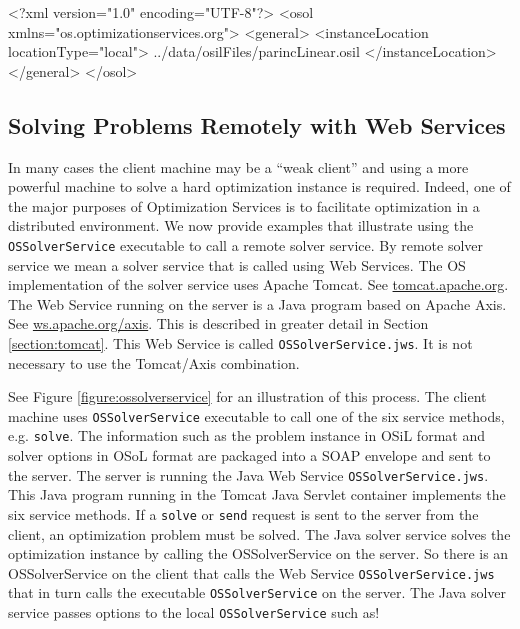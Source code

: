 \documentclass[11pt]{article}
\newcounter{Fig}
\renewcommand{\_}{{\char"5F}}
\renewcommand{\{}{{\char"7B}}
\renewcommand{\}}{{\char"7D}}
\renewcommand{\^}{{\char"0D}}
\renewcommand{\'}{{\char"0D}}
\begin{document}
\begin{verbatimtab}[4]
<?xml version="1.0" encoding="UTF-8"?>
<osol xmlns="os.optimizationservices.org">
	<general>
		<instanceLocation locationType="local">
			../data/osilFiles/parincLinear.osil
		</instanceLocation>
	</general>
</osol>
\end{verbatimtab}

\subsection{Solving Problems Remotely with Web Services}\label{section:servicemethods}

In many cases the client machine may be a ``weak client'' and  using a more powerful machine to solve a hard optimization instance is required. Indeed, one of the major purposes of Optimization Services is to facilitate optimization in a distributed environment.   We now provide examples that illustrate using the {\tt OSSolverService} executable to call a remote solver service.   By remote solver service we mean a solver service that is called using Web Services.  The OS implementation  of the solver service  uses Apache Tomcat. See \url{tomcat.apache.org}. The Web Service running on the server is a Java program based on Apache Axis. See \url{ws.apache.org/axis}. This is described in greater detail in Section \ref{section:tomcat}.  This Web Service is called {\tt OSSolverService.jws}. It is not necessary to use the Tomcat/Axis combination.



See Figure \ref{figure:ossolverservice} for an illustration of this process. The client machine uses {\tt OSSolverService} executable to call one of the six service methods, e.g. {\tt solve}. The  information such as the problem instance in OSiL format and solver options in OSoL format are packaged into a SOAP envelope and sent to the server. The server is running the Java Web Service {\tt OSSolverService.jws}. This Java program running in the Tomcat Java Servlet container implements the six service methods. If a {\tt solve} or {\tt send} request is sent to the server from the client, an optimization problem must be solved. The Java solver service solves the optimization instance by  calling the  OSSolverService on the server. So there is an OSSolverService on the client that calls the Web Service {\tt  OSSolverService.jws} that in turn calls  the executable {\tt OSSolverService} on the server. The Java solver service passes options to the local {\tt OSSolverService} such as!
 
\end{document}
